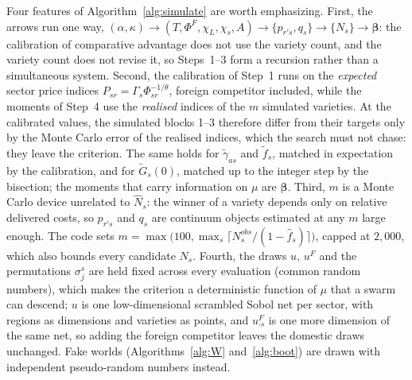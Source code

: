 Four features of Algorithm~\ref{alg:simulate} are worth emphasizing. First, the arrows run one way, $(\alpha,\kappa)\to(T,\Phi^F,\chi_L,\chi_s,A)\to\{p_{r's},q_s\}\to\{N_s\}\to\boldsymbol\beta$: the calibration of comparative advantage does not use the variety count, and the variety count does not revise it, so Steps~1--3 form a recursion rather than a simultaneous system. Second, the calibration of Step~1 runs on the \emph{expected} sector price indices $P_{sr}=\Gamma_s\Phi_{sr}^{-1/\theta}$, foreign competitor included, while the moments of Step~4 use the \emph{realised} indices of the $m$ simulated varieties. At the calibrated values, the simulated blocks 1--3 therefore differ from their targets only by the Monte Carlo error of the realised indices, which the search must not chase: they leave the criterion. The same holds for $\tilde\gamma_{as}$ and $\tilde f_s$, matched in expectation by the calibration, and for $\tilde G_s(0)$, matched up to the integer step by the bisection; the moments that carry information on $\mu$ are $\boldsymbol\beta$. Third, $m$ is a Monte Carlo device unrelated to $\hat{N}_s$: the winner of a variety depends only on relative delivered costs, so $p_{r's}$ and $q_s$ are continuum objects estimated at any $m$ large enough. The code sets $m=\max\bigl(100,\max_s\lceil N^{obs}_s/(1-\hat f_s)\rceil\bigr)$, capped at $2{,}000$, which also bounds every candidate $N_s$. Fourth, the draws $u$, $u^F$ and the permutations $\sigma^s_j$ are held fixed across every evaluation (common random numbers), which makes the criterion a deterministic function of $\mu$ that a swarm can descend; $u$ is one low-dimensional scrambled Sobol net per sector, with regions as dimensions and varieties as points, and $u^F_{\cdot s}$ is one more dimension of the same net, so adding the foreign competitor leaves the domestic draws unchanged. Fake worlds (Algorithms~\ref{alg:W} and~\ref{alg:boot}) are drawn with independent pseudo-random numbers instead.

